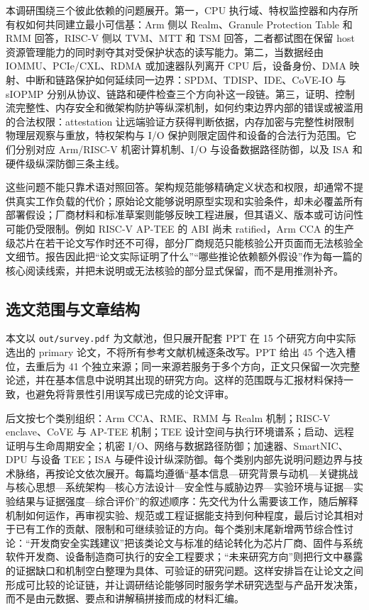 \documentclass[11pt]{ctexart}
\begin{document}
本调研围绕三个彼此依赖的问题展开。第一，CPU 执行域、特权监控器和内存所有权如何共同建立最小可信基：Arm 侧以 Realm、Granule Protection Table 和 RMM 回答，RISC-V 侧以 TVM、MTT 和 TSM 回答，二者都试图在保留 host 资源管理能力的同时剥夺其对受保护状态的读写能力。第二，当数据经由 IOMMU、PCIe/CXL、RDMA 或加速器队列离开 CPU 后，设备身份、DMA 映射、中断和链路保护如何延续同一边界：SPDM、TDISP、IDE、CoVE-IO 与 sIOPMP 分别从协议、链路和硬件检查三个方向补这一段链。第三，证明、控制流完整性、内存安全和微架构防护等纵深机制，如何约束边界内部的错误或被滥用的合法权限：attestation 让远端验证方获得判断依据，内存加密与完整性树限制物理层观察与重放，特权架构与 I/O 保护则限定固件和设备的合法行为范围。它们分别对应 Arm/RISC-V 机密计算机制、I/O 与设备数据路径防御，以及 ISA 和硬件级纵深防御三条主线。

这些问题不能只靠术语对照回答。架构规范能够精确定义状态和权限，却通常不提供真实工作负载的代价；原始论文能够说明原型实现和实验条件，却未必覆盖所有部署假设；厂商材料和标准草案则能够反映工程进展，但其语义、版本或可访问性可能仍受限制。例如 RISC-V AP-TEE 的 ABI 尚未 ratified，Arm CCA 的生产级芯片在若干论文写作时还不可得，部分厂商规范只能核验公开页面而无法核验全文细节。报告因此把“论文实际证明了什么”“哪些推论依赖额外假设”作为每一篇的核心阅读线索，并把未说明或无法核验的部分显式保留，而不是用推测补齐。

\subsection{选文范围与文章结构}

本文以 \texttt{out/survey.pdf} 为文献池，但只展开配套 PPT 在 15 个研究方向中实际选出的 primary 论文，不将所有参考文献机械逐条改写。PPT 给出 45 个选入槽位，去重后为 41 个独立来源；同一来源若服务于多个方向，正文只保留一次完整论述，并在基本信息中说明其出现的研究方向。这样的范围既与汇报材料保持一致，也避免将背景性引用误写成已完成的论文评审。

后文按七个类别组织：Arm CCA、RME、RMM 与 Realm 机制；RISC-V enclave、CoVE 与 AP-TEE 机制；TEE 设计空间与执行环境谱系；启动、远程证明与生命周期安全；机密 I/O、网络与数据路径防御；加速器、SmartNIC、DPU 与设备 TEE；ISA 与硬件设计纵深防御。每个类别内部先说明问题边界与技术脉络，再按论文依次展开。每篇均遵循“基本信息—研究背景与动机—关键挑战与核心思想—系统架构—核心方法设计—安全性与威胁边界—实验环境与证据—实验结果与证据强度—综合评价”的叙述顺序：先交代为什么需要该工作，随后解释机制如何运作，再审视实验、规范或工程证据能支持到何种程度，最后讨论其相对于已有工作的贡献、限制和可继续验证的方向。每个类别末尾新增两节综合性讨论：“开发商安全实践建议”把该类论文与标准的结论转化为芯片厂商、固件与系统软件开发商、设备制造商可执行的安全工程要求；“未来研究方向”则把行文中暴露的证据缺口和机制空白整理为具体、可验证的研究问题。这样安排旨在让论文之间形成可比较的论证链，并让调研结论能够同时服务学术研究选型与产品开发决策，而不是由元数据、要点和讲解稿拼接而成的材料汇编。\cite{li2024sokteechoices,boubakri2025riscvtee,arm_cca_spec,riscv_privileged}
\end{document}
